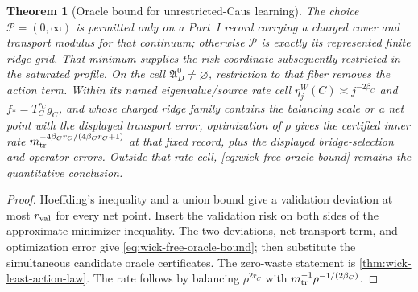 \documentclass[11pt]{article}
\numberwithin{section}{part}
\theoremstyle{plain}
\newtheorem{theorem}{Theorem}[section]
\theoremstyle{definition}
\theoremstyle{remark}
\begin{document}
\begin{theorem}[Oracle bound for unrestricted-Caus learning]
The choice \(\mathcal P=(0,\infty)\) is permitted only on a Part~I record
carrying a charged cover and transport modulus for that continuum; otherwise
\(\mathcal P\) is exactly its represented finite ridge grid.
That minimum supplies the risk coordinate subsequently restricted in the
saturated profile.  On the cell
\(\mathfrak A_D^0\ne\varnothing\), restriction to that fiber removes the
action term.  Within its named eigenvalue/source rate cell
\(\eta_j^W(C)\asymp j^{-2\beta_C}\) and
\(f_*=T_C^{r_C}g_C\), and whose charged ridge family contains the balancing
scale or a net point with the displayed transport error, optimization of
\(\rho\) gives the certified inner rate
\(m_{\rm tr}^{-4\beta_Cr_C/(4\beta_Cr_C+1)}\) at that fixed record,
plus the displayed bridge-selection and operator errors.  Outside that rate
cell, \eqref{eq:wick-free-oracle-bound} remains the quantitative conclusion.
\end{theorem}

\begin{proof}
Hoeffding's inequality and a union bound give a validation deviation at most
\(r_{\rm val}\) for every net point.  Insert the validation risk on both
sides of the approximate-minimizer inequality.  The two deviations,
net-transport term, and optimization error give
\eqref{eq:wick-free-oracle-bound}; then substitute the simultaneous
candidate oracle certificates.  The zero-waste statement is
\cref{thm:wick-least-action-law}.  The rate follows by balancing
\(\rho^{2r_C}\) with
\(m_{\rm tr}^{-1}\rho^{-1/(2\beta_C)}\).
\end{proof}
\end{document}
